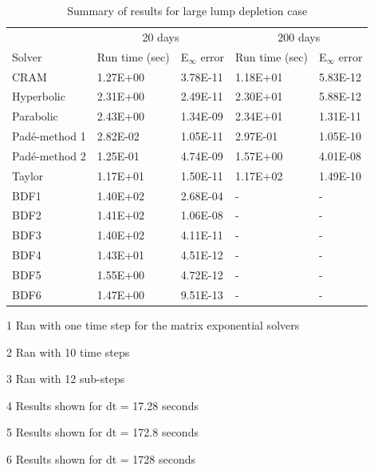 \clearpage

\begin{table}[p]
\centering
\begin{threeparttable}
   \caption{\label{tab:large_lumped_depletion_runtimes} Summary of results for large lump depletion case}
   \begin{tabular}{lllll}
   \hline
   \multicolumn{1}{c}{} & \multicolumn{2}{c}{20 days\tnote{1}} & \multicolumn{2}{c}{200 days\tnote{2}} \\
   \cline{2-5} 
   Solver & Run time (sec) & E$_{\infty}$ error & Run time (sec) & E$_{\infty}$ error \\
   \hline
   CRAM\tnote{3} & 1.27E+00 & 3.78E-11 & 1.18E+01 & 5.83E-12 \\
   Hyperbolic\tnote{3} & 2.31E+00 & 2.49E-11 & 2.30E+01 & 5.88E-12 \\
   Parabolic\tnote{3} & 2.43E+00 & 1.34E-09 & 2.34E+01 & 1.31E-11 \\
   Pad\'e-method 1 & 2.82E-02 & 1.05E-11 & 2.97E-01 & 1.05E-10 \\
   Pad\'e-method 2 & 1.25E-01 & 4.74E-09 & 1.57E+00 & 4.01E-08 \\
   Taylor & 1.17E+01 & 1.50E-11 & 1.17E+02 & 1.49E-10 \\
   BDF1\tnote{4} & 1.40E+02 & 2.68E-04 & - & - \\
   BDF2\tnote{4} & 1.41E+02 & 1.06E-08 & - & - \\
   BDF3\tnote{4} & 1.40E+02 & 4.11E-11 & - & - \\
   BDF4\tnote{5} & 1.43E+01 & 4.51E-12 & - & - \\
   BDF5\tnote{6} & 1.55E+00 & 4.72E-12 & - & - \\
   BDF6\tnote{6} & 1.47E+00 & 9.51E-13 & - & - \\
   \hline
   \end{tabular}
	\begin{tablenotes}
      \small
      \item [1] Ran with one time step for the matrix exponential solvers
      \item [2] Ran with 10 time steps
      \item [3] Ran with 12 sub-steps
      \item [4] Results shown for dt = 17.28 seconds
      \item [5] Results shown for dt = 172.8 seconds
      \item [6] Results shown for dt = 1728 seconds
    \end{tablenotes}
\end{threeparttable}
\end{table} 

